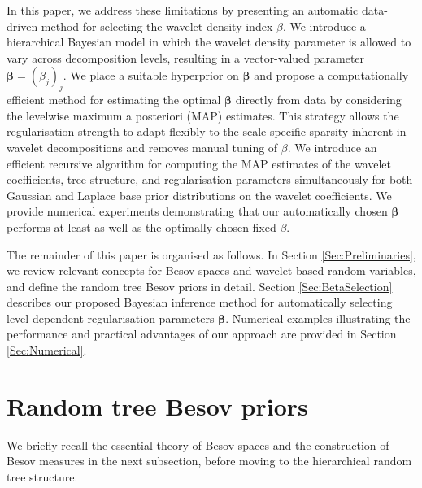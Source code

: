 \documentclass[11pt,a4paper]{article}
\begin{document}
In this paper, we address these limitations by presenting an automatic data-driven method for selecting the wavelet density index $\beta$. We introduce a hierarchical Bayesian model in which the wavelet density parameter is allowed to vary across decomposition levels, resulting in a vector-valued parameter $\boldsymbol{\beta}= (\beta_j)_j$. We place a suitable hyperprior on $\boldsymbol{\beta}$ and propose a computationally efficient method for estimating the optimal $\boldsymbol{\beta}$ directly from data by considering the levelwise maximum a posteriori (MAP) estimates. This strategy allows the regularisation strength to adapt flexibly to the scale-specific sparsity inherent in wavelet decompositions and removes manual tuning of $\beta$. We introduce an efficient recursive algorithm for computing the MAP estimates of the wavelet coefficients, tree structure, and regularisation parameters simultaneously for both Gaussian and Laplace base prior distributions on the wavelet coefficients. We provide numerical experiments demonstrating that our automatically chosen $\boldsymbol{\beta}$ performs at least as well as the optimally chosen fixed $\beta$. 

The remainder of this paper is organised as follows. In Section \ref{Sec:Preliminaries}, we review relevant concepts for Besov spaces and wavelet-based random variables, and define the random tree Besov priors in detail. Section \ref{Sec:BetaSelection} describes our proposed Bayesian inference method for automatically selecting level-dependent regularisation parameters $\boldsymbol{\beta}$. Numerical examples illustrating the performance and practical advantages of our approach are provided in Section \ref{Sec:Numerical}. 



\section{Random tree Besov priors\label{Sec:Preliminaries}}

We briefly recall the essential theory of Besov spaces and the construction of Besov measures in the next subsection, before moving to the hierarchical random tree structure.
\end{document}
